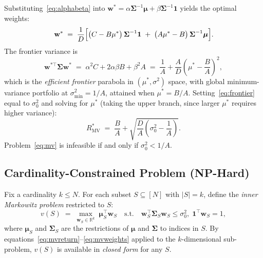 \documentclass[11pt]{article}
\begin{document}
Substituting~\eqref{eq:alphabeta} into $\mathbf{w}^*=\alpha\boldsymbol{\Sigma}^{-1}
\boldsymbol{\mu}+\beta\boldsymbol{\Sigma}^{-1}\mathbf{1}$ yields the optimal weights:
\begin{equation}
  \mathbf{w}^* \;=\; \frac{1}{D}\Bigl[
    \bigl(C - B\mu^*\bigr)\,\boldsymbol{\Sigma}^{-1}\mathbf{1}
    \;+\;
    \bigl(A\mu^* - B\bigr)\,\boldsymbol{\Sigma}^{-1}\boldsymbol{\mu}
  \Bigr].
  \label{eq:mvweights}
\end{equation}
The frontier variance is
\begin{equation}
  \mathbf{w}^{*\top}\boldsymbol{\Sigma}\mathbf{w}^*
  \;=\; \alpha^2 C + 2\alpha\beta B + \beta^2 A
  \;=\; \frac{1}{A} + \frac{A}{D}\!\left(\mu^* - \frac{B}{A}\right)^{\!2},
  \label{eq:frontier}
\end{equation}
which is the \emph{efficient frontier} parabola in $(\mu^*,\sigma^2)$ space,
with global minimum-variance portfolio at $\sigma^2_{\min}=1/A$, attained when
$\mu^*=B/A$.  Setting~\eqref{eq:frontier} equal to $\sigma_0^2$ and solving
for $\mu^*$ (taking the upper branch, since larger $\mu^*$ requires higher variance):
\begin{equation}
  R^*_{\text{MV}} \;=\; \frac{B}{A} + \sqrt{\frac{D}{A}\left(\sigma_0^2
  - \frac{1}{A}\right)}.
  \label{eq:mvreturn}
\end{equation}
Problem~\eqref{eq:mv} is infeasible if and only if $\sigma_0^2 < 1/A$.

\subsection{Cardinality-Constrained Problem (NP-Hard)}

Fix a cardinality $k \leq N$.  For each subset $S \subseteq [N]$ with
$|S|=k$, define the \emph{inner Markowitz problem} restricted to $S$:
\begin{equation}
  v(S) \;=\;
  \max_{\mathbf{w}_S\in\mathbb{R}^k}\;
    \boldsymbol{\mu}_S^\top\mathbf{w}_S
  \quad\text{s.t.}\quad
  \mathbf{w}_S^\top\boldsymbol{\Sigma}_S\mathbf{w}_S\leq\sigma_0^2,\;
  \mathbf{1}^\top\mathbf{w}_S=1,
  \label{eq:inner}
\end{equation}
where $\boldsymbol{\mu}_S$ and $\boldsymbol{\Sigma}_S$ are the restrictions of
$\boldsymbol{\mu}$ and $\boldsymbol{\Sigma}$ to indices in $S$.  By
equations~\eqref{eq:mvreturn}--\eqref{eq:mvweights} applied to the $k$-dimensional
sub-problem, $v(S)$ is available in \emph{closed form} for any $S$.
\end{document}

